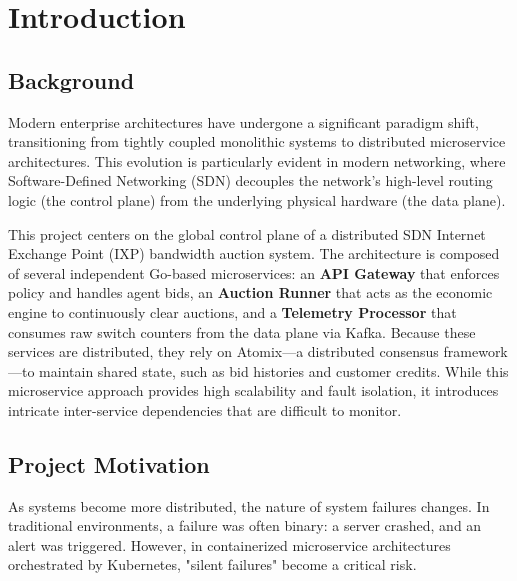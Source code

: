 \documentclass[11pt, a4paper]{article}
\begin{document}

\section{Introduction}
\subsection{Background}
Modern enterprise architectures have undergone a significant paradigm shift, transitioning from tightly coupled monolithic systems to distributed microservice architectures. This evolution is particularly evident in modern networking, where Software-Defined Networking (SDN) decouples the network's high-level routing logic (the control plane) from the underlying physical hardware (the data plane).

This project centers on the global control plane of a distributed SDN Internet Exchange Point (IXP) bandwidth auction system. The architecture is composed of several independent Go-based microservices: an \textbf{API Gateway} that enforces policy and handles agent bids, an \textbf{Auction Runner} that acts as the economic engine to continuously clear auctions, and a \textbf{Telemetry Processor} that consumes raw switch counters from the data plane via Kafka. Because these services are distributed, they rely on Atomix—a distributed consensus framework—to maintain shared state, such as bid histories and customer credits. While this microservice approach provides high scalability and fault isolation, it introduces intricate inter-service dependencies that are difficult to monitor.

\subsection{Project Motivation}
As systems become more distributed, the nature of system failures changes. In traditional environments, a failure was often binary: a server crashed, and an alert was triggered. However, in containerized microservice architectures orchestrated by Kubernetes, "silent failures" become a critical risk.
\end{document}
